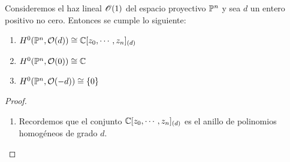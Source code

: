 	\begin{theorem}\label{seccionesproyectivo}
		Consideremos el haz lineal $\mathscr{O}(1)$ del espacio proyectivo $\mathbb{P}^n$ y sea $d$ un entero positivo no cero. Entonces se cumple lo siguiente:
		\begin{enumerate}
			\item $H^0(\mathbb{P}^n, \mathcal{O}(d))\cong \mathbb{C}[z_0,\cdots,z_n]_{(d)}$
			\item $H^0(\mathbb{P}^n, \mathcal{O}(0))\cong \mathbb{C}$
			\item $H^0(\mathbb{P}^n, \mathcal{O}(-d))\cong\{0\}$
		\end{enumerate}
	\end{theorem}
	\begin{proof} $ $
		\begin{enumerate}
			\item Recordemos que el conjunto $\mathbb{C}[z_0,\cdots,z_n]_{(d)}$ es el anillo de polinomios homogéneos de grado $d$.
			

\end{enumerate}
\end{proof}
